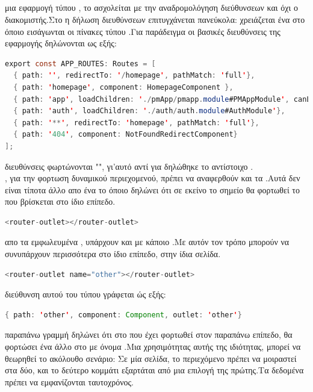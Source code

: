 \subsection*{}
 μια εφαρμογή τύπου , το  ασχολείται με την αναδρομολόγηση διεύθυνσεων και όχι ο διακομιστής.Στο  η δήλωση διευθύνσεων επιτυγχάνεται πανεύκολα: χρειάζεται ένα  στο όποιο εισάγωνται οι πίνακες τύπου .Για παράδειγμα οι βασικές διευθύνσεις της εφαρμογής  δηλώνονται ως εξής:\\
	\begin{lstlisting}[language=Java]
export const APP_ROUTES: Routes = [
  { path: '', redirectTo: '/homepage', pathMatch: 'full'},
  { path: 'homepage', component: HomepageComponent },
  { path: 'app', loadChildren: './pmApp/pmapp.module#PMAppModule', canLoad: [AuthGuard]},
  { path: 'auth', loadChildren: './auth/auth.module#AuthModule'},
  { path: '**', redirectTo: 'homepage', pathMatch: 'full'},
  { path: '404', component: NotFoundRedirectComponent}
];
	\end{lstlisting}
 διευθύνσεις  φωρτώνονται "", γι'αυτό αντί για  δηλώθηκε το αντίστοιχο .\\
, για την φορτωση δυναμικού περιεχομενού, πρέπει να αναφερθούν και τα .Αυτά δεν είναι τίποτα άλλο απο ένα  το όποιο δηλώνει ότι σε εκείνο το σημείο θα φορτωθεί το  που βρίσκεται στο ίδιο επίπεδο.
	\begin{lstlisting}[language=Java]
	<router-outlet></router-outlet>
	\end{lstlisting}
 απο τα εμφωλευμένα , υπάρχουν και  με κάποιο .Με αυτόν τον τρόπο μπορούν να συνυπάρχουν περισσότερα  στο ίδιο επίπεδο, στην ίδια σελίδα.
	\begin{lstlisting}[language=Java]
	<router-outlet name="other"></router-outlet>
	\end{lstlisting}
 διεύθυνση αυτού του τύπου  γράφεται ώς εξής:\\
	\begin{lstlisting}[language=Java]
{ path: 'other', component: Component, outlet: 'other'}
	\end{lstlisting}
 παραπάνω γραμμή δηλώνει ότι στο  που έχει φορτωθεί στον παραπάνω επίπεδο, θα φορτώσει ένα άλλο στο  με όνομα .Μια χρησιμότητας αυτής της ιδιότητας, μπορεί να θεωρηθεί το ακόλουθο σενάριο: Σε μία σελίδα, το περιεχόμενο πρέπει να μοιραστεί στα δύο, και το δεύτερο κομμάτι εξαρτάται από μια επιλογή της πρώτης.Τα δεδομένα πρέπει να εμφανίζονται ταυτοχρόνος.

